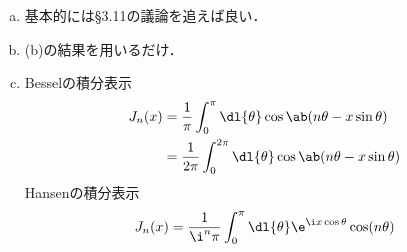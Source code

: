 \begin{enumerate}[%
  label=%
  \fbox{%
   {\thesection.\arabic*}%
    },%
    leftmargin=3\parindent]
\begin{enumerate}[(a)]
        さて，デルタ関数は，$\sinc$関数を用いて
        \begin{gather}
          \lim_{\epsilon \to 0} \delta_\epsilon(x) = \lim_{\epsilon \to 0} \frac{\sin(x/\epsilon)}{x / \epsilon} \frac{1}{\pi \epsilon} = \delta(x)\\
          \lim_{\epsilon \to 0} \frac{\cos(x/\epsilon)}{x/\epsilon} \frac{1}{\pi \epsilon} = 0
        \end{gather}
        として表すことができることを用いると，
        \begin{gather}
          \lim_{R\to \infty} \frac{1}{\pi}\frac{1}{\sqrt{kk'}}\ab[\frac{\sin\ab[(k-k')R]}{k-k'}]  = \frac{1}{k}\delta(k-k')\\
          \begin{split}
            &\lim_{R \to \infty} \frac{1}{\pi} \frac{1}{\sqrt{kk'}} \frac{\cos\ab[(k+k')R - \nu \pi]}{k+k'} \\
            &\qq\qq\qq  = \frac{1}{\sqrt{kk'}} \delta(k+k')\cos(\nu \pi) = 0 \qq \text{if}\qq k, k'>0
        \end{split}
        \end{gather}
        であるから，
        \begin{gather}
          \int_0^\infty \dl{\rho}\rho J_\nu(k\rho) J_\nu(k' \rho) = \frac{1}{k}\delta(k-k')
        \end{gather}
        が従う．
      \item 基本的には§3.11の議論を追えば良い．
      \item (b)の結果を用いるだけ．
      \item Besselの積分表示
        \begin{align}
          J_n(x) &= \frac{1}{\pi} \int_0^\pi \dl{\theta}\cos\ab(n\theta - x \sin\theta)\\
                 &=  \frac{1}{2\pi} \int_0^{2\pi} \dl{\theta} \cos\ab(n \theta - x \sin\theta)
        \end{align}
        Hansenの積分表示
        \begin{gather}
          J_n(x) = \frac{1}{\i^n \pi} \int_0^\pi \dl{\theta} \e^{\i x \cos\theta} \cos (n\theta)
        \end{gather}
    \end{enumerate}


\end{enumerate}
